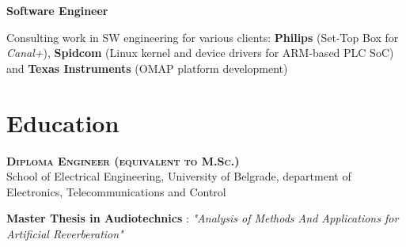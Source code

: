 \documentclass[8pt, a4paper, oneside, final]{scrartcl}
\begin{document}
\begin{minipage}[t]{0.48\linewidth}
{    \smallskip
    {\color{Black}\textbf{Software Engineer}}
  }

  \medskip

  Consulting work in SW engineering for various clients:
  \textbf{Philips} (Set-Top Box for \textit{Canal+}),
  \textbf{Spidcom} (Linux kernel and device drivers for ARM-based PLC SoC) and
  \textbf{Texas Instruments} (OMAP platform development)

  \medskip

  \section{Education}

    \textbf{\textsc{Diploma Engineer (equivalent to M.Sc.)}} \\
    School of Electrical Engineering, University of Belgrade,
    department of Electronics, Telecommunications and Control

    \medskip

    \textbf{Master Thesis in Audiotechnics} : \textit{"Analysis of Methods And
         Applications for Artificial Reverberation"}

\end{minipage}\hspace{0.04\linewidth}
\end{document}
